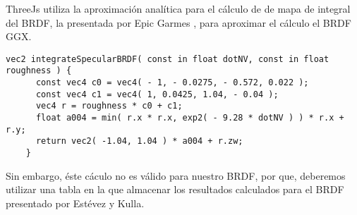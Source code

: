     ThreeJs utiliza la aproximaci\'on anal\'itica para el c\'alculo de de mapa de integral del BRDF,
    la presentada por Epic Garmes \autocite{shadingmobile}, para aproximar el c\'alculo el BRDF GGX.

    \begin{lstlisting}[caption=Apromixaci\'on anal\'itica a la integral del BRDF en ThreeJs]
    vec2 integrateSpecularBRDF( const in float dotNV, const in float roughness ) {
      const vec4 c0 = vec4( - 1, - 0.0275, - 0.572, 0.022 );
      const vec4 c1 = vec4( 1, 0.0425, 1.04, - 0.04 );
      vec4 r = roughness * c0 + c1;
      float a004 = min( r.x * r.x, exp2( - 9.28 * dotNV ) ) * r.x + r.y;
      return vec2( -1.04, 1.04 ) * a004 + r.zw;
    }
    \end{lstlisting}

    Sin embargo, \'este c\'aculo no es v\'alido para nuestro BRDF, por que, deberemos utilizar una
    tabla en la que almacenar los resultados calculados para el BRDF presentado por Est\'evez y Kulla.
  \egroup
